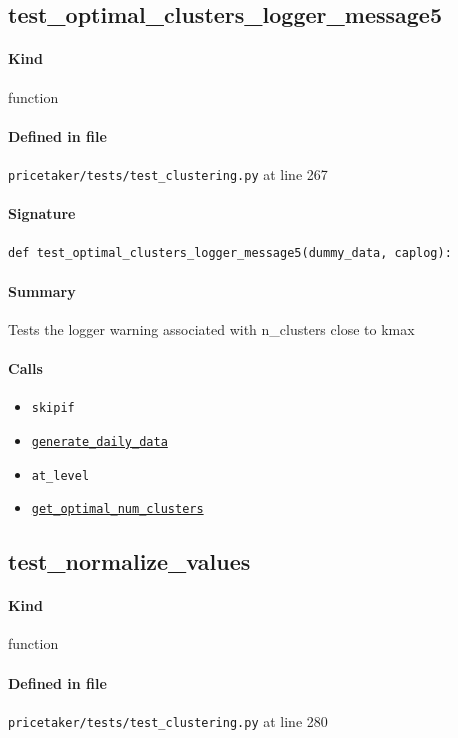 \documentclass[11pt]{report}
\begin{document}
\subsection{test\_optimal\_clusters\_logger\_message5}
\label{def:pricetaker-tests-test_clustering.py:test_optimal_clusters_logger_message5:L267}
\paragraph{Kind} function
\paragraph{Defined in file} \texttt{pricetaker/tests/test\_clustering.py} at line 267
\paragraph{Signature} \texttt{def test\_optimal\_clusters\_logger\_message5(dummy\_data, caplog):}
\paragraph{Summary} Tests the logger warning associated with n\_clusters close to kmax
\paragraph{Calls}
\begin{itemize}[leftmargin=*]
  \item \texttt{skipif}
  \item \hyperref[def:pricetaker-clustering.py:generate_daily_data:L35]{\texttt{generate\_daily\_data}}
  \item \texttt{at\_level}
  \item \hyperref[def:pricetaker-clustering.py:get_optimal_num_clusters:L142]{\texttt{get\_optimal\_num\_clusters}}
\end{itemize}
\subsection{test\_normalize\_values}
\label{def:pricetaker-tests-test_clustering.py:test_normalize_values:L280}
\paragraph{Kind} function
\paragraph{Defined in file} \texttt{pricetaker/tests/test\_clustering.py} at line 280
\end{document}
